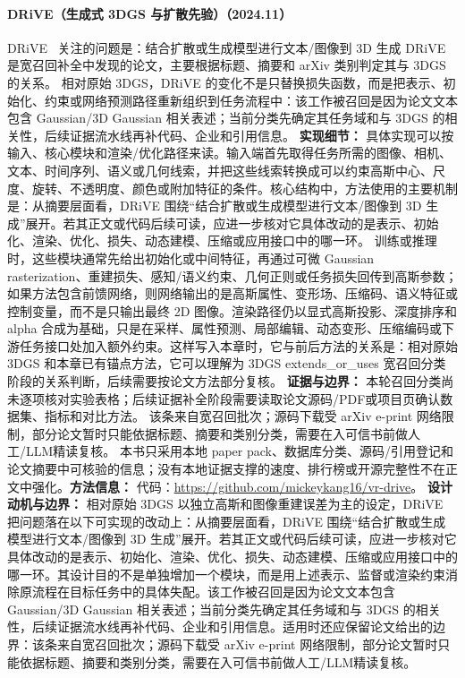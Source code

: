 \paragraph{DRiVE（生成式 3DGS 与扩散先验）（2024.11）}
DRiVE~\cite{2411_17423} 关注的问题是：结合扩散或生成模型进行文本/图像到 3D 生成 DRiVE 是宽召回补全中发现的论文，主要根据标题、摘要和 arXiv 类别判定其与 3DGS 的关系。
相对原始 3DGS，DRiVE 的变化不是只替换损失函数，而是把表示、初始化、约束或网络预测路径重新组织到任务流程中：该工作被召回是因为论文文本包含 Gaussian/3D Gaussian 相关表述；当前分类先确定其任务域和与 3DGS 的相关性，后续证据流水线再补代码、企业和引用信息。
\textbf{实现细节：} 具体实现可以按输入、核心模块和渲染/优化路径来读。输入端首先取得任务所需的图像、相机、文本、时间序列、语义或几何线索，并把这些线索转换成可以约束高斯中心、尺度、旋转、不透明度、颜色或附加特征的条件。核心结构中，方法使用的主要机制是：从摘要层面看，DRiVE 围绕“结合扩散或生成模型进行文本/图像到 3D 生成”展开。若其正文或代码后续可读，应进一步核对它具体改动的是表示、初始化、渲染、优化、损失、动态建模、压缩或应用接口中的哪一环。 训练或推理时，这些模块通常先给出初始化或中间特征，再通过可微 Gaussian rasterization、重建损失、感知/语义约束、几何正则或任务损失回传到高斯参数；如果方法包含前馈网络，则网络输出的是高斯属性、变形场、压缩码、语义特征或控制变量，而不是只输出最终 2D 图像。渲染路径仍以显式高斯投影、深度排序和 alpha 合成为基础，只是在采样、属性预测、局部编辑、动态变形、压缩编码或下游任务接口处加入额外约束。这样写入本章时，它与前后方法的关系是：相对原始 3DGS 和本章已有锚点方法，它可以理解为 3DGS extends\_or\_uses 宽召回分类阶段的关系判断，后续需要按论文方法部分复核。
\textbf{证据与边界：} 本轮召回分类尚未逐项核对实验表格；后续证据补全阶段需要读取论文源码/PDF或项目页确认数据集、指标和对比方法。 该条来自宽召回批次；源码下载受 arXiv e-print 网络限制，部分论文暂时只能依据标题、摘要和类别分类，需要在入可信书前做人工/LLM精读复核。 本书只采用本地 paper pack、数据库分类、源码/引用登记和论文摘要中可核验的信息；没有本地证据支撑的速度、排行榜或开源完整性不在正文中强化。\textbf{方法信息：} 代码：\url{https://github.com/mickeykang16/vr-drive}。
\textbf{设计动机与边界：} 相对原始 3DGS 以独立高斯和图像重建误差为主的设定，DRiVE 把问题落在以下可实现的改动上：从摘要层面看，DRiVE 围绕“结合扩散或生成模型进行文本/图像到 3D 生成”展开。若其正文或代码后续可读，应进一步核对它具体改动的是表示、初始化、渲染、优化、损失、动态建模、压缩或应用接口中的哪一环。其设计目的不是单独增加一个模块，而是用上述表示、监督或渲染约束消除原流程在目标任务中的具体失配。该工作被召回是因为论文文本包含 Gaussian/3D Gaussian 相关表述；当前分类先确定其任务域和与 3DGS 的相关性，后续证据流水线再补代码、企业和引用信息。适用时还应保留论文给出的边界：该条来自宽召回批次；源码下载受 arXiv e-print 网络限制，部分论文暂时只能依据标题、摘要和类别分类，需要在入可信书前做人工/LLM精读复核。
